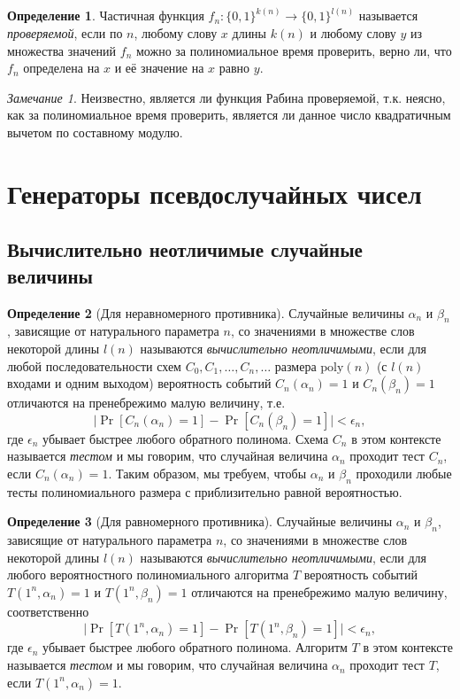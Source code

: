 \documentclass[12pt,a4paper]{article}
\newcommand{\poly}{\mathrm{poly}}
\theoremstyle{definition}
\newtheorem{definition}{Определение}[section]
\theoremstyle{plain}
\theoremstyle{remark}
\newtheorem{remark}{Замечание}[section]
\begin{document}
\begin{definition}
Частичная функция $f_n:\{0,1\}^{k(n)}\to \{0,1\}^{l(n)}$ называется
\emph{проверяемой}, если по $n$, любому слову $x$ длины $k(n)$
и любому слову $y$ из множества значений $f_n$ можно 
за полиномиальное время проверить, верно ли, что $f_n$
определена на $x$ и её значение на $x$ равно $y$.
\end{definition}
\begin{remark}
Неизвестно, является ли функция Рабина проверяемой, т.к. неясно, как за полиномиальное время проверить, является
ли данное число квадратичным вычетом по составному модулю.
\end{remark}


\section{Генераторы псевдослучайных чисел}
\subsection{Вычислительно неотличимые случайные величины}
\begin{definition}[Для неравномерного противника]
Случайные величины $\alpha_n$ и $\beta_n$, зависящие
от натурального параметра $n$, со значениями в множестве
слов некоторой длины $l(n)$ называются \emph{вычислительно
неотличимыми}, если для любой последовательности схем
$C_0,C_1,\dotsc, C_n,\dotsc$ размера $\poly(n)$
(с $l(n)$ входами и одним выходом) вероятность событий
$C_n(\alpha_n) = 1$ и $C_n(\beta_n) = 1$ отличаются на 
пренебрежимо малую величину, т.е. 
$$\bigl|\Pr[C_n(\alpha_n) = 1] - \Pr[C_n(\beta_n) = 1]\bigr|<\epsilon_n,$$
где $\epsilon_n$ убывает быстрее любого обратного полинома.
Схема $C_n$ в этом контексте
называется \emph{тестом} и мы говорим, что случайная величина
$\alpha_n$ проходит тест $C_n$, если $C_n(\alpha_n)= 1$.
Таким образом, мы требуем, чтобы $\alpha_n$ и $\beta_n$
проходили любые тесты полиномиального размера с приблизительно
равной вероятностью.
\end{definition}

\begin{definition}[Для равномерного противника]
Случайные величины $\alpha_n$ и $\beta_n$, зависящие
от натурального параметра $n$, со значениями в множестве
слов некоторой длины $l(n)$ называются \emph{вычислительно
неотличимыми}, если для любого вероятностного 
полиномиального алгоритма $T$ вероятность событий
$T(1^n, \alpha_n) = 1$ и $T(1^n, \beta_n) = 1$ отличаются на 
пренебрежимо малую величину, соответственно
$$\bigl|\Pr[T(1^n, \alpha_n) = 1] - \Pr[T(1^n, \beta_n) = 1]\bigr|<\epsilon_n,$$
где $\epsilon_n$ убывает быстрее любого обратного полинома.
Алгоритм $T$ в этом контексте
называется \emph{тестом} и мы говорим, что случайная величина
$\alpha_n$ проходит тест $T$, если $T(1^n, \alpha_n)= 1$.
\end{definition}
\end{document}

